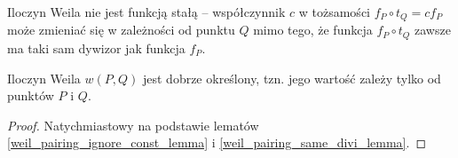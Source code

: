 \begin{remark}
Iloczyn Weila nie jest funkcją stałą --
współczynnik $c$ w tożsamości $f_P \circ t_Q = cf_P$
może zmieniać się w zależności od punktu $Q$ mimo tego,
że funkcja $f_P \circ t_Q$ zawsze ma taki sam dywizor jak funkcja $f_P$.
\end{remark}

\begin{theorem}
Iloczyn Weila $w(P, Q)$ jest dobrze określony,
tzn. jego wartość zależy tylko od punktów $P$ i $Q$.
\end{theorem}

\begin{proof}
Natychmiastowy na podstawie lematów
\ref{weil_pairing_ignore_const_lemma} i \ref{weil_pairing_same_divi_lemma}.
\end{proof}
